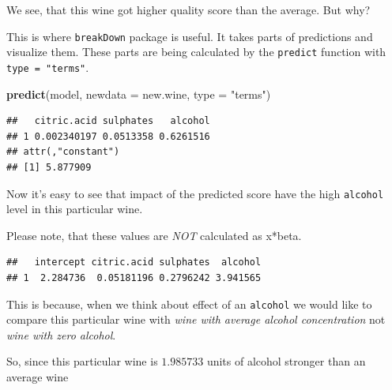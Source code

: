 \documentclass[]{book}
\newenvironment{Shaded}{\begin{snugshade}}{\end{snugshade}}
\newcommand{\KeywordTok}[1]{\textcolor[rgb]{0.13,0.29,0.53}{\textbf{#1}}}
\newcommand{\DataTypeTok}[1]{\textcolor[rgb]{0.13,0.29,0.53}{#1}}
\newcommand{\DecValTok}[1]{\textcolor[rgb]{0.00,0.00,0.81}{#1}}
\newcommand{\StringTok}[1]{\textcolor[rgb]{0.31,0.60,0.02}{#1}}
\newcommand{\OperatorTok}[1]{\textcolor[rgb]{0.81,0.36,0.00}{\textbf{#1}}}
\newcommand{\NormalTok}[1]{#1}
\theoremstyle{definition}
\theoremstyle{definition}
\theoremstyle{definition}
\theoremstyle{remark}
\begin{document}
We see, that this wine got higher quality score than the average. But
why?

This is where \texttt{breakDown} package is useful. It takes parts of
predictions and visualize them. These parts are being calculated by the
\texttt{predict} function with \texttt{type\ =\ "terms"}.

\begin{Shaded}
\begin{Highlighting}[]
\KeywordTok{predict}\NormalTok{(model, }\DataTypeTok{newdata =}\NormalTok{ new.wine, }\DataTypeTok{type =} \StringTok{"terms"}\NormalTok{)}
\end{Highlighting}
\end{Shaded}

\begin{verbatim}
##   citric.acid sulphates   alcohol
## 1 0.002340197 0.0513358 0.6261516
## attr(,"constant")
## [1] 5.877909
\end{verbatim}

Now it's easy to see that impact of the predicted score have the high
\texttt{alcohol} level in this particular wine.

Please note, that these values are \emph{NOT} calculated as x*beta.

\begin{Shaded}
\end{Shaded}

\begin{verbatim}
##   intercept citric.acid sulphates  alcohol
## 1  2.284736  0.05181196 0.2796242 3.941565
\end{verbatim}

This is because, when we think about effect of an \texttt{alcohol} we
would like to compare this particular wine with \emph{wine with average
alcohol concentration} not \emph{wine with zero alcohol}.

So, since this particular wine is \(1.985733\) units of alcohol stronger
than an average wine

\begin{Shaded}
\end{Shaded}
\end{document}
